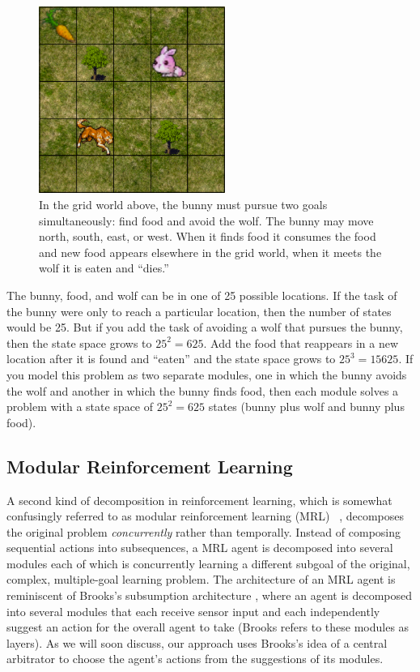 \begin{figure}[h]

\begin{center}
\includegraphics[height=2.4in]{bunny.png}
\end{center}
\caption{In the grid world above, the bunny must pursue two goals simultaneously: find food and avoid the wolf.  The bunny may move north, south, east, or west.  When it finds food it consumes the food and new food appears elsewhere in the grid world, when it meets the wolf it is eaten and ``dies.''}
\label{fig:bunny-picture}
\end{figure}

The bunny, food, and wolf can be in one of 25 possible locations. If the task of the bunny were only to reach a particular location, then the number of states would be 25. But if you add the task of avoiding a wolf that pursues the bunny, then the state space grows to $25^2 = 625$. Add the food that reappears in a new location after it is found and ``eaten'' and the state space grows to $25^3 = 15625$. If you model this problem as two separate modules, one in which the bunny avoids the wolf and another in which the bunny finds food, then each module solves a problem with a state space of $25^2 = 625$ states (bunny plus wolf and bunny plus food).

\subsection{Modular Reinforcement Learning}\label{sec:mrl}

A second kind of decomposition in reinforcement learning, which is somewhat confusingly referred to as modular reinforcement learning (MRL) ~\cite{russell2003q-decomposition,sprague2003multiple-goal}, decomposes the original problem {\it concurrently} rather than temporally. Instead of composing sequential actions into subsequences, a MRL agent is decomposed into several modules each of which is concurrently learning a different subgoal of the original, complex, multiple-goal learning problem. The architecture of an MRL agent is reminiscent of Brooks's subsumption architecture \cite{brooks1986a-robust}, where an agent is decomposed into several modules that each receive sensor input and each independently suggest an action for the overall agent to take (Brooks refers to these modules as layers). As we will soon discuss, our approach uses Brooks's idea of a central arbitrator to choose the agent's actions from the suggestions of its modules.

